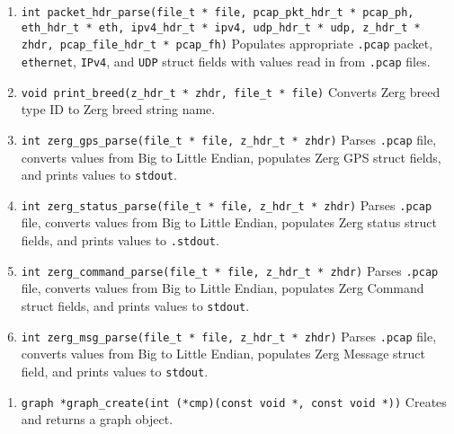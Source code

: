 \documentclass[12pt]{article}
\begin{document}
{{{\begin{enumerate}
 \item \lstinline|int packet_hdr_parse(file_t * file, pcap_pkt_hdr_t * pcap_ph, eth_hdr_t * eth, ipv4_hdr_t * ipv4, udp_hdr_t * udp, z_hdr_t * zhdr, pcap_file_hdr_t * pcap_fh)|
\newline
Populates appropriate \lstinline|.pcap| packet, \lstinline|ethernet|, \lstinline|IPv4|, and \lstinline|UDP| struct fields with values read in from \lstinline|.pcap| files.

\item \lstinline|void print_breed(z_hdr_t * zhdr, file_t * file)|
\newline
Converts Zerg breed type ID to Zerg breed string name. 

\item \lstinline|int zerg_gps_parse(file_t * file, z_hdr_t * zhdr)|
\newline
Parses \lstinline|.pcap| file, converts values from Big to Little Endian, populates Zerg GPS struct fields, and prints values to \lstinline|stdout|.

\item \lstinline|int zerg_status_parse(file_t * file, z_hdr_t * zhdr)|
\newline
Parses \lstinline|.pcap| file, converts values from Big to Little Endian, populates Zerg status struct fields, and prints values to \lstinline|.stdout|.

\item \lstinline|int zerg_command_parse(file_t * file, z_hdr_t * zhdr)|
\newline
Parses \lstinline|.pcap| file, converts values from Big to Little Endian, populates Zerg Command struct fields, and prints values to \lstinline|stdout|.

\item \lstinline|int zerg_msg_parse(file_t * file, z_hdr_t * zhdr)|
\newline
Parses \lstinline|.pcap| file, converts values from Big to Little Endian, populates Zerg Message struct field, and prints values to \lstinline|stdout|.
\end{enumerate}
\hspace{8pt}
\begin{enumerate}
\subsection{graph.c}

\item \lstinline|graph *graph_create(int (*cmp)(const void *, const void *))|
\newline
Creates and returns a graph object.


\end{enumerate}}}}
\end{document}
